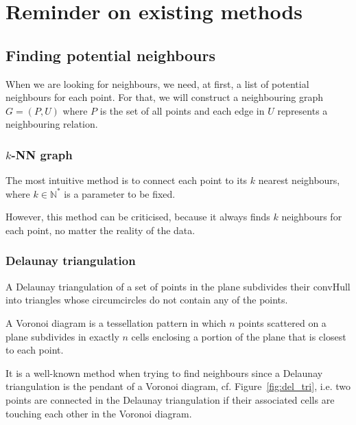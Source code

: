 \documentclass[lettersize,journal,english]{IEEEtran}
\begin{document}
\section{Reminder on existing methods\label{sec:reminder}}
    \subsection{Finding potential neighbours}
        When we are looking for neighbours, we need, at first, a list of potential neighbours for each point.
        For that, we will construct a neighbouring graph $G = (P, U)$ where $P$ is the set of all points and each edge in $U$ represents a neighbouring relation.

        \subsubsection{$k$-NN graph}
            The most intuitive method is to connect each point to its $k$ nearest neighbours, where $k \in \mathbb{N}^*$ is a parameter to be fixed. 

            However, this method can be criticised, because it always finds $k$ neighbours for each point, no matter the reality of the data.

        \subsubsection{Delaunay triangulation}
            A Delaunay triangulation \cite{art_delaunay} of a set of points in the plane subdivides their \gls{convHull} into triangles whose circumcircles do not contain any of the points.

            A Voronoi diagram is a tessellation pattern in which $n$ points scattered on a plane subdivides in exactly $n$ cells enclosing a portion of the plane that is closest to each point. 

            It is a well-known method when trying to find neighbours \cite{delaunay_neighbor} since a Delaunay triangulation is the pendant of a Voronoi diagram, cf. Figure~\ref{fig:del_tri}, i.e. two points are connected in the
            Delaunay triangulation if their associated cells are touching each other in the Voronoi diagram.
\end{document}
